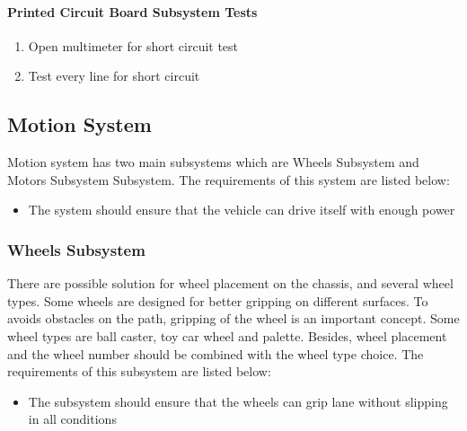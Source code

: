 \documentclass[a4paper,12pt]{article}
\begin{document}
		
	
	\paragraph{Printed Circuit Board Subsystem Tests}

		\begin{enumerate} 
			\item Open multimeter for short circuit test \vspace{-0.2cm}
			\item Test every line for short circuit
		\end{enumerate}
			
	
	
	
	\subsection{Motion System}
	
	Motion system has two main subsystems which are Wheels Subsystem and Motors Subsystem Subsystem. The requirements of this system are listed below:
	\begin{itemize}
		\item The system should	ensure that the vehicle can drive itself with enough power
	\end{itemize}
	
	
	
	\subsubsection{Wheels Subsystem}
	There are possible solution for wheel placement on the chassis, and several wheel types. Some wheels are designed for better gripping on different surfaces. To avoids obstacles on the path, gripping of the wheel is an important concept. Some wheel types are ball caster, toy car wheel and palette. Besides, wheel placement and the wheel number should be combined with the wheel type choice. The requirements of this subsystem are listed below:
	\begin{itemize}
		\item The subsystem should ensure that the wheels can grip lane without slipping in all conditions 	
	\end{itemize}
	
\end{document}
